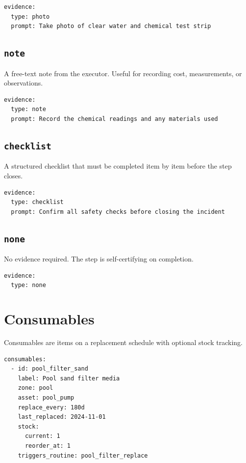 \begin{verbatim}
evidence:
  type: photo
  prompt: Take photo of clear water and chemical test strip
\end{verbatim}

\subsection{\texttt{note}}

A free-text note from the executor. Useful for recording cost, measurements, or observations.

\begin{verbatim}
evidence:
  type: note
  prompt: Record the chemical readings and any materials used
\end{verbatim}

\subsection{\texttt{checklist}}

A structured checklist that must be completed item by item before the step closes.

\begin{verbatim}
evidence:
  type: checklist
  prompt: Confirm all safety checks before closing the incident
\end{verbatim}

\subsection{\texttt{none}}

No evidence required. The step is self-certifying on completion.

\begin{verbatim}
evidence:
  type: none
\end{verbatim}

\section{Consumables}
\label{sec:schema-consumables}

Consumables are items on a replacement schedule with optional stock tracking.

\begin{verbatim}
consumables:
  - id: pool_filter_sand
    label: Pool sand filter media
    zone: pool
    asset: pool_pump
    replace_every: 180d
    last_replaced: 2024-11-01
    stock:
      current: 1
      reorder_at: 1
    triggers_routine: pool_filter_replace
\end{verbatim}

